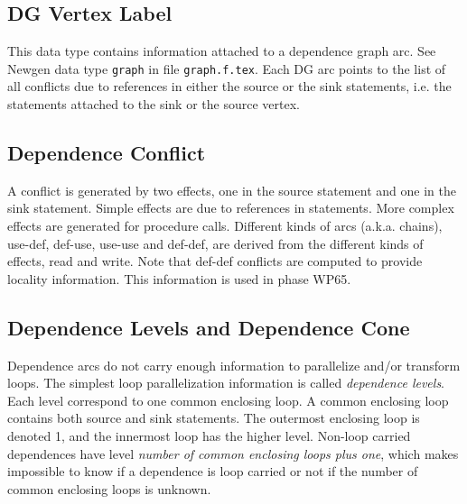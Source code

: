 \subsection{DG Vertex Label}

{}

This data type contains information attached to a dependence graph arc.
See Newgen data type \verb/graph/ in file \verb/graph.f.tex/. Each DG arc
points to the list of all conflicts due to references in either the
source or the sink statements, i.e. the statements attached to the sink
or the source vertex.

\iffalse
Ce domaine est utilise' pour contenir les informations qui sont
attache'es a` chaque arc du graphe de de'pendances (voir le domaine {\tt
graph} dans le fichier {\tt graph.f.tex}). Chaque arc du GD contient les
conflits entre les deux statements des noeuds du graphe de de'pendance.
\fi

\subsection{Dependence Conflict}

{}

A conflict is generated by two effects, one in the source statement and
one in the sink statement. Simple effects are due to references in
statements. More complex effects are generated for procedure
calls. Different kinds of arcs (a.k.a. chains), use-def, def-use,
use-use and def-def, are derived from the different kinds of effects,
read and write. Note that def-def conflicts are computed to provide
locality information. This information is used in phase WP65.

\iffalse
Un conflit existe entre deux effets pre'sents dans deux noeuds voisins
du graphe de de'pendance. Les types d'effet (write, read) sert a`
distinguer les conflits ``use-def'', ``def-def'' et ``{def-use}''. Le
cone comprend les informations precises de conflict.
\fi

\subsection{Dependence Levels and Dependence Cone}

{}

Dependence arcs do not carry enough information to parallelize and/or
transform loops. The simplest loop parallelization information is called
{\em dependence levels}. Each level correspond to one common enclosing
loop. A common enclosing loop contains both source and sink
statements. The outermost enclosing loop is denoted 1, and the innermost
loop has the higher level. Non-loop carried dependences have level {\em
number of common enclosing loops plus one}, which makes impossible to
know if a dependence is loop carried or not if the number of common
enclosing loops is unknown.


